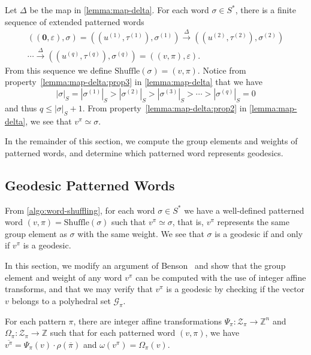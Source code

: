 \begin{algorithm}\label{algo:word-shuffling}
	Let $\Delta$ be the map in \cref{lemma:map-delta}.
	For each word $\sigma \in S^*$, there is a finite sequence of extended patterned words
	\begin{multline}\label{algo:word-shuffling/sequence}
		((\mathbf{0},\varepsilon),\sigma)
		=
		((u^{(1)},\tau^{(1)}),\sigma^{(1)})
		\xrightarrow{\Delta}
		((u^{(2)},\tau^{(2)}),\sigma^{(2)})
		\\\cdots
		\xrightarrow{\Delta}
		((u^{(q)},\tau^{(q)}),\sigma^{(q)})
		=
		((v,\pi),\varepsilon).
	\end{multline}
	From this sequence we define $\mathrm{Shuffle}(\sigma) = (v,\pi)$.
	Notice from property~\ref{lemma:map-delta:prop3} in \cref{lemma:map-delta} that we have
	\[
		|\sigma|_S = |\sigma^{(1)}|_S >
		|\sigma^{(2)}|_S >
		|\sigma^{(3)}|_S >
		\cdots >
		|\sigma^{(q)}|_S
		= 0
	\]
	and thus $q \leqslant |\sigma|_S + 1$.
From property~\ref{lemma:map-delta:prop2} in \cref{lemma:map-delta}, we see that $v^\pi \simeq \sigma$.
\end{algorithm}

In the remainder of this section, we compute the group elements and weights of patterned words, and determine which patterned word represents geodesics.

\subsection{Geodesic Patterned Words}\label{sec:patterned-words/properties}

From \cref{algo:word-shuffling}, for each word $\sigma \in S^*$ we have a well-defined patterned word $(v,\pi) = \mathrm{Shuffle}(\sigma)$ such that $v^\pi \simeq \sigma$, that is, $v^\pi$ represents the same group element as $\sigma$ with the same weight.
We see that $\sigma$ is a geodesic if and only if $v^\pi$ is a geodesic.

In this section, we modify an argument of Benson~\cite{benson1983} and show that the group element and weight of any word $v^\pi$ can be computed with the use of integer affine transforms, and that we may verify that $v^\pi$ is a geodesic by checking if the vector $v$ belongs to a polyhedral set $\mathcal{G}_\pi$.

\begin{lemma}\label{lemma:patterned-word-maps}
	For each pattern $\pi$, there are integer affine transformations $\Psi_{\pi} \colon \mathcal{Z}_\pi \to \mathbb{Z}^n$ and $\Omega_{\pi} \colon \mathcal{Z}_\pi \to \mathbb{Z}$ such that for each patterned word $(v,\pi)$, we have $\overline{v^\pi} = \Psi_\pi(v) \cdot \rho(\overline{\pi})$ and $\omega(v^\pi) = \Omega_\pi(v)$.
\end{lemma}

